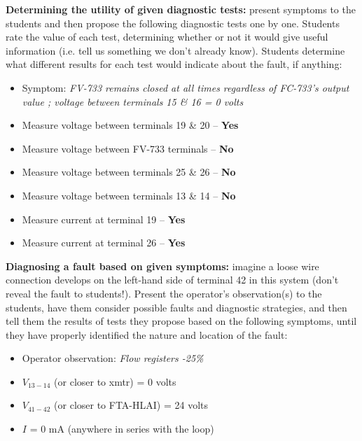 \vskip 10pt


\noindent
{\bf Determining the utility of given diagnostic tests:} present symptoms to the students and then propose the following diagnostic tests one by one.  Students rate the value of each test, determining whether or not it would give useful information (i.e. tell us something we don't already know).  Students determine what different results for each test would indicate about the fault, if anything:

\begin{itemize}
\item{} Symptom: {\it FV-733 remains closed at all times regardless of FC-733's output value ; voltage between terminals 15 \& 16 = 0 volts}
\item{} Measure voltage between terminals 19 \& 20 -- {\bf Yes}
\item{} Measure voltage between FV-733 terminals -- {\bf No}
\item{} Measure voltage between terminals 25 \& 26 -- {\bf No}
\item{} Measure voltage between terminals 13 \& 14 -- {\bf No}
\item{} Measure current at terminal 19 -- {\bf Yes}
\item{} Measure current at terminal 26 -- {\bf Yes}
\end{itemize}


\vskip 10pt


\noindent
{\bf Diagnosing a fault based on given symptoms:} imagine a loose wire connection develops on the left-hand side of terminal 42 in this system (don't reveal the fault to students!).  Present the operator's observation(s) to the students, have them consider possible faults and diagnostic strategies, and then tell them the results of tests they propose based on the following symptoms, until they have properly identified the nature and location of the fault:

\begin{itemize}
\item{} Operator observation: {\it Flow registers -25\%}
\item{} $V_{13-14}$ (or closer to xmtr) = 0 volts
\item{} $V_{41-42}$ (or closer to FTA-HLAI) = 24 volts
\item{} $I$ = 0 mA (anywhere in series with the loop)
\end{itemize}



